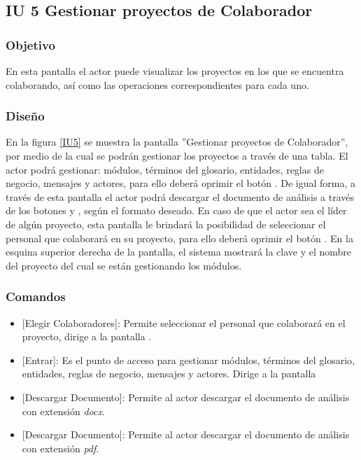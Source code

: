 \subsection{IU 5 Gestionar proyectos de Colaborador}

\subsubsection{Objetivo}
	En esta pantalla el actor puede visualizar los proyectos en los que se encuentra colaborando, así como las operaciones correspondientes para cada uno.
\subsubsection{Diseño}
	En la figura \ref{IU5} se muestra la pantalla ''Gestionar proyectos de Colaborador'', por medio de la cual se podrán gestionar los proyectos a través de una tabla. El actor podrá gestionar: módulos, términos del glosario, entidades, reglas de negocio, mensajes y actores, para ello deberá oprimir el botón . De igual forma, a través de esta pantalla el actor podrá descargar el documento de análisis a través de los botones 
	 y , según el formato deseado. En caso de que el actor sea el líder de algún proyecto,	esta pantalla le brindará la posibilidad de seleccionar el personal que colaborará en su proyecto, para ello deberá oprimir el botón .
	En la esquina superior derecha de la pantalla, el sistema mostrará la clave y el nombre del proyecto del cual se están gestionando los módulos.

\label{IU5}
\subsubsection{Comandos}
\begin{itemize}
	\item {} [Elegir Colaboradores]: Permite seleccionar el personal que colaborará en el proyecto, dirige a la pantalla .
	\item {} [Entrar]: Es el punto de acceso para gestionar módulos, términos del glosario, entidades, reglas de negocio, mensajes y actores. Dirige a la pantalla 
	\item {} [Descargar Documento]: Permite al actor descargar el documento de análisis con extensión {\em docx}.
	\item {} [Descargar Documento]: Permite al actor descargar el documento de análisis con extensión {\em pdf}.
\end{itemize}
